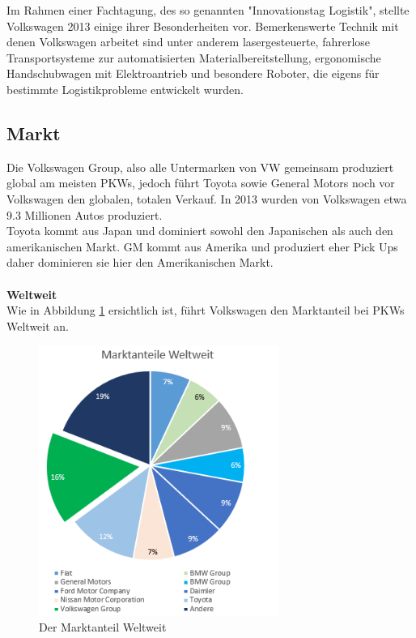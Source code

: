 \documentclass[12pt]{article}
\begin{document}
Im Rahmen einer Fachtagung, des so genannten "Innovationstag Logistik", stellte Volkswagen 2013 einige ihrer Besonderheiten vor. Bemerkenswerte Technik mit denen Volkswagen arbeitet sind unter anderem lasergesteuerte, fahrerlose Transportsysteme zur automatisierten Materialbereitstellung, ergonomische Handschubwagen mit Elektroantrieb und besondere Roboter, die eigens für bestimmte Logistikprobleme entwickelt wurden.\cite{wolfsburg}

\subsection{Markt}
Die Volkswagen Group, also alle Untermarken von VW gemeinsam produziert global am meisten PKWs, jedoch führt Toyota sowie General Motors noch vor Volkswagen den globalen, totalen Verkauf. 
In 2013 wurden von Volkswagen etwa 9.3 Millionen Autos produziert. \\
Toyota kommt aus Japan und dominiert sowohl den Japanischen als auch den amerikanischen Markt. GM kommt aus Amerika und produziert eher Pick Ups daher dominieren sie hier den Amerikanischen Markt.
\\\\
\textbf{Weltweit}\\
Wie in Abbildung \ref{fig:marktwelt} ersichtlich ist, führt Volkswagen den Marktanteil bei PKWs Weltweit an. 
\begin{figure}[here!]
\centering
\includegraphics[width=0.7\textwidth]{images/maww}
\caption{Der Marktanteil Weltweit}
\label{fig:marktwelt}
\end{figure}\FloatBarrier
\end{document}
